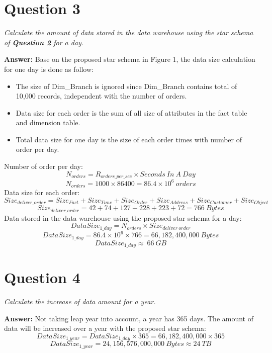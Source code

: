 \documentclass[a4paper,11pt]{article}
\begin{document}
\pagebreak

\section*{Question 3}

\textit{Calculate the amount of data stored in the data warehouse using the star schema of \textbf{Question 2} for a day.} 

\noindent
\textbf{Answer:} Base on the proposed star schema in Figure 1, the data size calculation for one day is done as follow: 
\begin{itemize}
    \setlength{\itemsep}{0cm}
        \setlength{\parskip}{0cm}
    \item The size of Dim\_Branch is ignored since Dim\_Branch contains total of 10,000 records, independent with the number of orders.
    \item Data size for each order is the sum of all size of attributes in the fact table and dimension table.
    \item Total data size for one day is the size of each order times with number of order per day.
\end{itemize}

\noindent
Number of order per day:
\vspace{-0.75em}
$$N_{orders}=R_{orders\_per\_sec}\times Seconds\ In\ A\ Day$$
$$N_{orders}=1000 \times 86400=86.4\times 10^{6}\ orders$$
Data size for each order:
$$Size_{deliver\_order}=Size_{Fact}+Size_{Time}+Size_{Order}+Size_{Address}+Size_{Customer}+Size_{Object}$$
$$Size_{deliver\_order}=42+74+127+228+223+72=766\ Bytes$$
Data stored in the data warehouse using the proposed star schema for a day:
$$DataSize_{1\_day}=N_{orders}\times Size_{deliver\ order}$$
$$DataSize_{1\_day}=86.4\times 10^{6}\times 766=66,182,400,000\ Bytes$$
$$DataSize_{1\_day}\approx\ 66\ GB$$

\section*{Question 4}

\textit{Calculate the increase of data amount for a year.} 

\noindent
\textbf{Answer:} Not taking leap year into account, a year has 365 days.
The amount of data will be increased over a year with the proposed star schema:
\vspace{-0.75em}
$$DataSize_{1\_year}=DataSize_{1\_day}\times 365=66,182,400,000\times 365$$
$$DataSize_{1\_year}=24,156,576,000,000\ Bytes\approx 24\ TB$$
\end{document}
